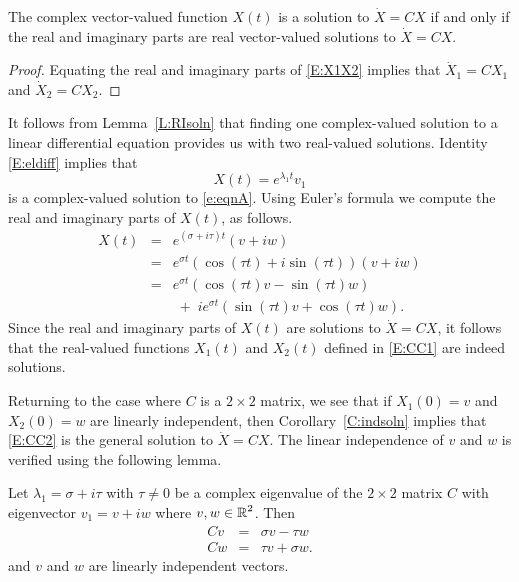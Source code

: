 \documentclass{ximera}
\begin{document}
\begin{lemma}  \label{L:RIsoln}
The complex vector-valued function $X(t)$ is a solution to $\dot{X}=CX$ if
and only if the real and imaginary parts are real vector-valued solutions
to $\dot{X}=CX$.
\end{lemma}

\begin{proof} 
Equating the real and imaginary parts of \eqref{E:X1X2} implies that
$\dot{X}_1 = CX_1$ and $\dot{X}_2 = CX_2$.
\end{proof}

It follows from Lemma~\ref{L:RIsoln} that finding one complex-valued solution
to a linear differential equation provides us with two real-valued solutions.
Identity \eqref{E:eldiff} implies that
\[
X(t) = e^{\lambda_1 t}v_1
\]
is a complex-valued solution to \eqref{e:eqnA}.  Using Euler's formula we
compute the real and imaginary parts of $X(t)$, as follows.
\begin{eqnarray*}
X(t) & = & e^{(\sigma+i\tau)t}(v+iw) \\
& = & e^{\sigma t} (\cos(\tau t)+i\sin(\tau t))(v+iw)\\
& = & e^{\sigma t}(\cos(\tau t)v-\sin(\tau t)w) \\ 
& & \; + \; ie^{\sigma t}(\sin(\tau t)v+\cos(\tau t)w).
\end{eqnarray*}
Since the real and imaginary parts of $X(t)$ are solutions to $\dot{X}=CX$, it
follows that the real-valued functions $X_1(t)$ and $X_2(t)$ defined in
\eqref{E:CC1} are indeed solutions.

Returning to the case where $C$ is a $2\times 2$ matrix, we see that if
$X_1(0)=v$ and $X_2(0)=w$ are linearly independent, then
Corollary~\ref{C:indsoln} implies that \eqref{E:CC2} is the general solution to
$\dot{X}=CX$.  The linear independence of $v$ and $w$ is verified using the
following lemma.

\begin{lemma}  \label{L:rievind}
Let $\lambda_1=\sigma+i\tau$ with $\tau\neq 0$ be a
complex eigenvalue of the
$2\times 2$ matrix $C$ with eigenvector
$v_1=v+iw$ where $v,w\in\mbox{$\mathbb{R}$}^2$.  Then
\begin{equation}  \label{e:complexcoord}
\begin{array}{rcl}
Cv & = & \sigma v - \tau w \\
Cw & = & \tau v + \sigma w.
\end{array}
\end{equation}
and $v$ and $w$ are linearly independent vectors.
\end{lemma}
\end{document}
